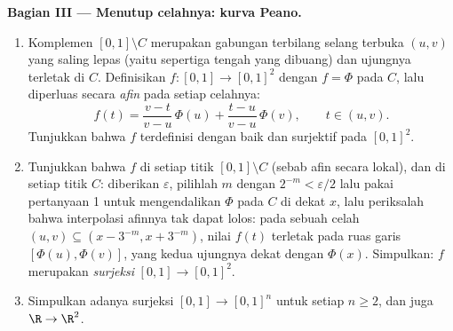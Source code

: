 \begin{problem}
\medskip
\noindent\textbf{Bagian III --- Menutup celahnya: kurva
Peano.}
\begin{enumerate}[resume]
  \item Komplemen $[0,1] \setminus C$ merupakan gabungan terbilang
        selang terbuka $(u, v)$ yang saling lepas (yaitu sepertiga tengah
        yang dibuang) dan ujungnya terletak di $C$. Definisikan $f \colon
        [0,1] \to [0,1]^2$ dengan $f = \Phi$ pada $C$, lalu diperluas
        secara \emph{afin} pada setiap celahnya:
        \[
        f(t) = \frac{v - t}{v - u}\,\Phi(u) +
        \frac{t - u}{v - u}\,\Phi(v),
        \qquad t \in (u, v).
        \]
        Tunjukkan bahwa $f$ terdefinisi dengan baik dan surjektif pada
        $[0,1]^2$.
  \item Tunjukkan bahwa $f$  di setiap titik $[0,1]
        \setminus C$ (sebab afin secara lokal), dan di setiap titik
        $C$: diberikan $\varepsilon$, pilihlah $m$ dengan $2^{-m} <
        \varepsilon/2$ lalu pakai pertanyaan 1 untuk mengendalikan $\Phi$ pada
        $C$ di dekat $x$, lalu periksalah bahwa interpolasi
        afinnya tak dapat lolos: pada sebuah celah $(u,v) \subseteq
        (x - 3^{-m}, x + 3^{-m})$, nilai $f(t)$ terletak pada
        ruas garis $[\Phi(u), \Phi(v)]$, yang kedua ujungnya dekat dengan
        $\Phi(x)$. Simpulkan: $f$ merupakan \emph{surjeksi
        } $[0,1] \to [0,1]^2$.
  \item Simpulkan adanya surjeksi  $[0,1] \to [0,1]^n$ untuk
        setiap $n \geq 2$, dan juga $\R \to \R^2$.
\end{enumerate}


\end{problem}
